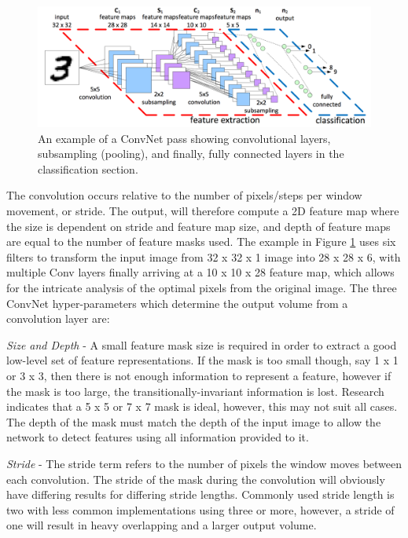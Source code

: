 \documentclass[fleqn,twoside,12pt]{report}
\begin{document}
\begin{figure}[h]
	\centering
	\includegraphics[width=\textwidth]{conv3.png}
	\caption{An example of a ConvNet pass showing convolutional layers, subsampling (pooling), and finally, fully connected layers in the classification section.}
	\label{fig:conv3}
\end{figure}

The convolution occurs relative to the number of pixels/steps per window movement, or stride. The output, will therefore compute a 2D feature map where the size is dependent on stride and feature map size, and depth of feature maps are equal to the number of feature masks used. The example in Figure \ref{fig:conv3} uses six filters to transform the input image from 32 x 32 x 1 image into 28 x 28 x 6, with multiple Conv layers finally arriving at a 10 x 10 x 28 feature map, which allows for the intricate analysis of the optimal pixels from the original image. The three ConvNet hyper-parameters which determine the output volume from a convolution layer are:

\textit{Size and Depth} - A small feature mask size is required in order to extract a good low-level set of feature representations. If the mask is too small though, say 1 x 1 or 3 x 3, then there is not enough information to represent a feature, however if the mask is too large, the transitionally-invariant information is lost. Research indicates that a 5 x 5 or 7 x 7 mask is ideal, however, this may not suit all cases. The depth of the mask must match the depth of the input image to allow the network to detect features using all information provided to it.

\textit{Stride} - The stride term refers to the number of pixels the window moves between each convolution. The stride of the mask during the convolution will obviously have differing results for differing stride lengths. Commonly used stride length is two with less common implementations using three or more, however, a stride of one will result in heavy overlapping and a larger output volume.
\end{document}
